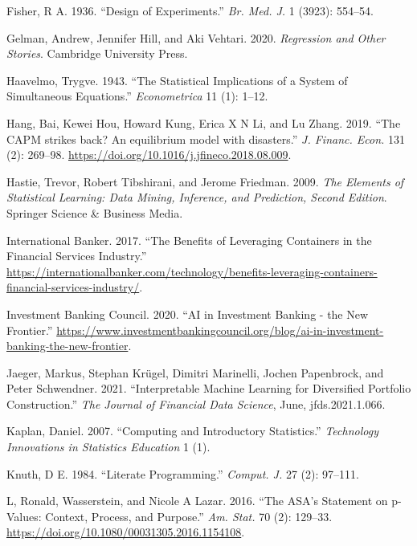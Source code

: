 \documentclass{article}
\newlength{\cslhangindent}
\newlength{\cslentryspacingunit} %
\newenvironment{CSLReferences}[2] %
 {%
  \setlength{\parindent}{0pt}
  \ifodd #1
  \let\oldpar\par
  \def\par{\hangindent=\cslhangindent\oldpar}
  \fi
  \setlength{\parskip}{#2\cslentryspacingunit}
 }%
 {}
\begin{document}
\begin{CSLReferences}{1}{0}
\leavevmode{}%
Fisher, R A. 1936. {``Design of Experiments.''} \emph{Br. Med. J.} 1
(3923): 554--54.

\leavevmode{}%
Gelman, Andrew, Jennifer Hill, and Aki Vehtari. 2020. \emph{Regression
and Other Stories}. Cambridge University Press.

\leavevmode{}%
Haavelmo, Trygve. 1943. {``The Statistical Implications of a System of
Simultaneous Equations.''} \emph{Econometrica} 11 (1): 1--12.

\leavevmode{}%
Hang, Bai, Kewei Hou, Howard Kung, Erica X N Li, and Lu Zhang. 2019.
{``{The CAPM strikes back? An equilibrium model with disasters}.''}
\emph{J. Financ. Econ.} 131 (2): 269--98.
\url{https://doi.org/10.1016/j.jfineco.2018.08.009}.

\leavevmode{}%
Hastie, Trevor, Robert Tibshirani, and Jerome Friedman. 2009. \emph{The
Elements of Statistical Learning: Data Mining, Inference, and
Prediction, Second Edition}. Springer Science \& Business Media.

\leavevmode{}%
International Banker. 2017. {``The Benefits of Leveraging Containers in
the Financial Services Industry.''}
\url{https://internationalbanker.com/technology/benefits-leveraging-containers-financial-services-industry/}.

\leavevmode{}%
Investment Banking Council. 2020. {``{AI} in Investment Banking - the
New Frontier.''}
\url{https://www.investmentbankingcouncil.org/blog/ai-in-investment-banking-the-new-frontier}.

\leavevmode{}%
Jaeger, Markus, Stephan Krügel, Dimitri Marinelli, Jochen Papenbrock,
and Peter Schwendner. 2021. {``Interpretable Machine Learning for
Diversified Portfolio Construction.''} \emph{The Journal of Financial
Data Science}, June, jfds.2021.1.066.

\leavevmode{}%
Kaplan, Daniel. 2007. {``Computing and Introductory Statistics.''}
\emph{Technology Innovations in Statistics Education} 1 (1).

\leavevmode{}%
Knuth, D E. 1984. {``Literate Programming.''} \emph{Comput. J.} 27 (2):
97--111.

\leavevmode{}%
L, Ronald, Wasserstein, and Nicole A Lazar. 2016. {``{The ASA's
Statement on p-Values: Context, Process, and Purpose}.''} \emph{Am.
Stat.} 70 (2): 129--33.
\url{https://doi.org/10.1080/00031305.2016.1154108}.


\end{CSLReferences}
\end{document}
